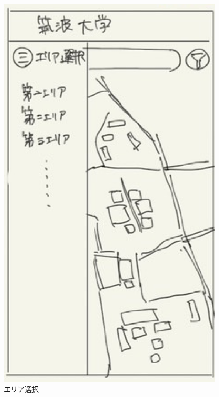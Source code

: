 \documentclass[12pt,a4paper,dvipdf]{jsarticle}
\begin{document}
\begin{figure}[H]
    \centering
    \begin{minipage}[b]{0.24\columnwidth}
        \centering
        \includegraphics[width=0.9\columnwidth]{./img/エリア選択.png}
        \caption{エリア選択}
    \end{minipage}
    \begin{minipage}[b]{0.24\columnwidth}
        \centering

\end{minipage}
\end{figure}
\end{document}
